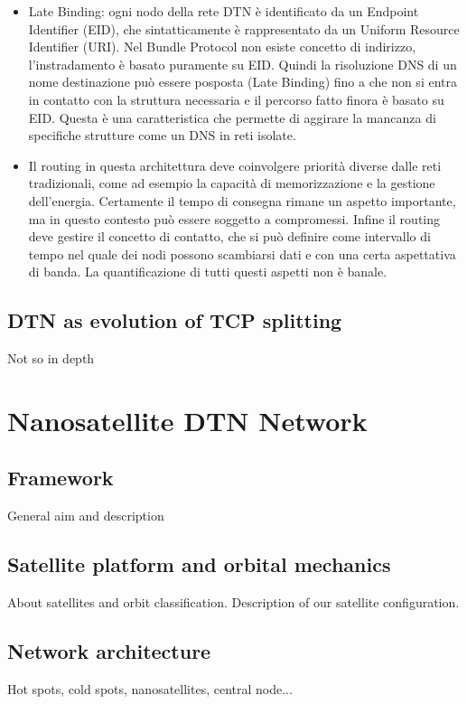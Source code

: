 \documentclass[a4paper]{article}
\begin{document}
\begin{itemize}
			\item Late Binding: ogni nodo della rete DTN è identificato da un Endpoint Identifier (EID), che sintatticamente è rappresentato da un Uniform Resource Identifier (URI). Nel Bundle Protocol non esiste concetto di indirizzo, l'instradamento è basato puramente su EID. Quindi la risoluzione DNS di un nome destinazione può essere posposta (Late Binding) fino a che non si entra in contatto con la struttura necessaria e il percorso fatto finora è basato su EID. Questa è una caratteristica che permette di aggirare la mancanza di specifiche strutture come un DNS in reti isolate.
			
			\item Il routing in questa architettura deve coinvolgere priorità diverse dalle reti tradizionali, come ad esempio la capacità di memorizzazione e la gestione dell'energia. Certamente il tempo di consegna rimane un aspetto importante, ma in questo contesto può essere soggetto a compromessi. Infine il routing deve gestire il concetto di contatto, che si può definire come intervallo di tempo nel quale dei nodi possono scambiarsi dati e con una certa aspettativa di banda. La  quantificazione di tutti questi aspetti non è banale.
			
			
		\end{itemize}
		
		
		
		\subsection{DTN as evolution of TCP splitting}
		{\sc Not so in depth}
		
	
	\section{Nanosatellite DTN Network}
		
		\subsection{Framework}
		{\sc General aim and description}
		
		\subsection{Satellite platform and orbital mechanics}
		{\sc About satellites and orbit classification.
		Description of our satellite configuration.}
		
		\subsection{Network architecture}	
		{\sc Hot spots, cold spots, nanosatellites, central node...}
		
\end{document}
